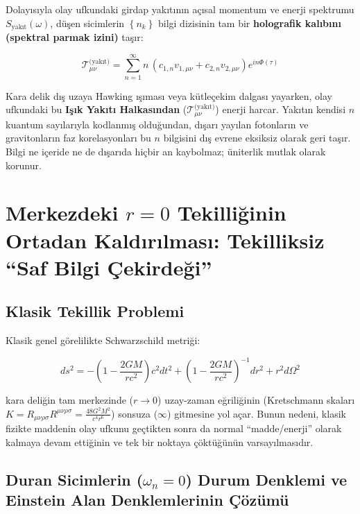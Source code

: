 \documentclass[12pt,a4paper]{article}
\begin{document}
Dolayısıyla olay ufkundaki girdap yakıtının açısal momentum ve enerji spektrumu $S_{\text{yakıt}}(\omega)$, düşen sicimlerin $\left\{n_k\right\}$ bilgi dizisinin tam bir \textbf{holografik kalıbını (spektral parmak izini)} taşır:

\begin{equation}
\mathcal{T}_{\mu\nu}^{\text{(yakıt)}} = \sum_{n=1}^{\infty} n \, \left( c_{1,n} v_{1,\mu\nu} + c_{2,n} v_{2,\mu\nu} \right) e^{i n \Phi(\tau)}
\end{equation}

Kara delik dış uzaya Hawking ışıması veya kütleçekim dalgası yayarken, olay ufkundaki bu \textbf{Işık Yakıtı Halkasından} ($\mathcal{T}_{\mu\nu}^{\text{(yakıt)}}$) enerji harcar. Yakıtın kendisi $n$ kuantum sayılarıyla kodlanmış olduğundan, dışarı yayılan fotonların ve gravitonların faz korelasyonları bu $n$ bilgisini dış evrene eksiksiz olarak geri taşır. Bilgi ne içeride ne de dışarıda hiçbir an kaybolmaz; üniterlik mutlak olarak korunur.

\section{Merkezdeki $r=0$ Tekilliğinin Ortadan Kaldırılması: Tekilliksiz ``Saf Bilgi Çekirdeği''}

\subsection{Klasik Tekillik Problemi}

Klasik genel görelilikte Schwarzschild metriği:

\begin{equation}
ds^2 = -\left(1 - \frac{2GM}{rc^2}\right) c^2 dt^2 + \left(1 - \frac{2GM}{rc^2}\right)^{-1} dr^2 + r^2 d\Omega^2
\end{equation}

kara deliğin tam merkezinde ($r \to 0$) uzay-zaman eğriliğinin (Kretschmann skaları $K = R_{\mu\nu\rho\sigma}R^{\mu\nu\rho\sigma} = \frac{48 G^2 M^2}{c^4 r^6}$) sonsuza ($\infty$) gitmesine yol açar. Bunun nedeni, klasik fizikte maddenin olay ufkunu geçtikten sonra da normal ``madde/enerji'' olarak kalmaya devam ettiğinin ve tek bir noktaya çöktüğünün varsayılmasıdır.

\subsection{Duran Sicimlerin ($\omega_n = 0$) Durum Denklemi ve Einstein Alan Denklemlerinin Çözümü}
\end{document}

